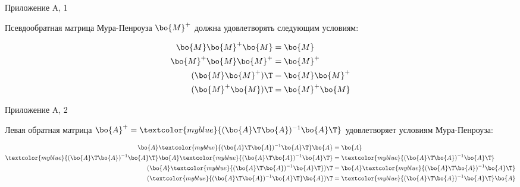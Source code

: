 \documentclass{beamer}
\begin{document}
\begin{frame}{Приложение A, 1}
	\begin{flushleft}
		
		Псевдообратная матрица Мура-Пенроуза $\bo{M}^+$ должна удовлетворять следующим условиям:
		
		\begin{align}
			\bo{M}\bo{M}^+\bo{M} &= \bo{M} \\
			\bo{M}^+\bo{M} \bo{M}^+ &= \bo{M}^+ \\
			(\bo{M}\bo{M}^+)\T &= \bo{M}\bo{M}^+ \\
			(\bo{M}^+\bo{M})\T &= \bo{M}^+\bo{M}
		\end{align}
		
	\end{flushleft}
\end{frame}



\begin{frame}{Приложение A, 2}
	\begin{flushleft}
		
		Левая обратная матрица $\bo{A}^+ =\textcolor{myblue}{ (\bo{A}\T \bo{A})^{-1} \bo{A}\T}$ удовлетворяет условиям Мура-Пенроуза:
		
		\begin{align}
			\bo{A}\textcolor{myblue}{(\bo{A}\T \bo{A})^{-1} \bo{A}\T}\bo{A} &= \bo{A} 
			\\
			\textcolor{myblue}{(\bo{A}\T \bo{A})^{-1} \bo{A}\T} \bo{A} \textcolor{myblue}{(\bo{A}\T \bo{A})^{-1} \bo{A}\T} &= \textcolor{myblue}{(\bo{A}\T \bo{A})^{-1} \bo{A}\T} \\
			(\bo{A} \textcolor{myblue}{(\bo{A}\T \bo{A})^{-1} \bo{A}\T})\T &= \bo{A} \textcolor{myblue}{(\bo{A}\T \bo{A})^{-1} \bo{A}\T} \\
			( \textcolor{myblue}{(\bo{A}\T \bo{A})^{-1} \bo{A}\T}\bo{A})\T &= \textcolor{myblue}{(\bo{A}\T \bo{A})^{-1} \bo{A}\T} \bo{A}
		\end{align}
		
	\end{flushleft}
\end{frame}
\end{document}
